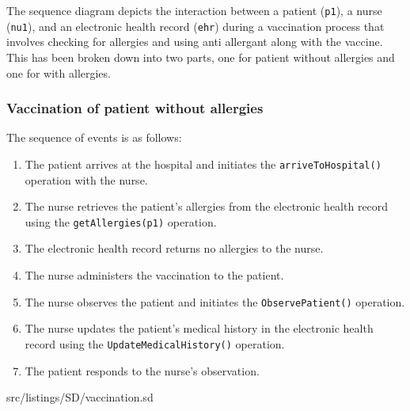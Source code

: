 The sequence diagram depicts the interaction between a patient (\texttt{p1}), a nurse (\texttt{nu1}), and an electronic health record (\texttt{ehr}) during a vaccination process that involves checking for allergies and using anti allergant along with the vaccine. This has been broken down into two parts, one for patient without allergies and one for with allergies.


\subsubsection{Vaccination of patient without allergies}
% 




The sequence of events is as follows:

\begin{enumerate}
\item The patient arrives at the hospital and initiates the \texttt{arriveToHospital()} operation with the nurse.
\item The nurse retrieves the patient's allergies from the electronic health record using the \texttt{getAllergies(p1)} operation.
\item The electronic health record returns no allergies to the nurse.
\item The nurse administers the vaccination to the patient.
\item The nurse observes the patient and initiates the \texttt{ObservePatient()} operation.
\item The nurse updates the patient's medical history in the electronic health record using the \texttt{UpdateMedicalHistory()} operation.
\item The patient responds to the nurse's observation.
\end{enumerate}

 {src/listings/SD/vaccination.sd}

